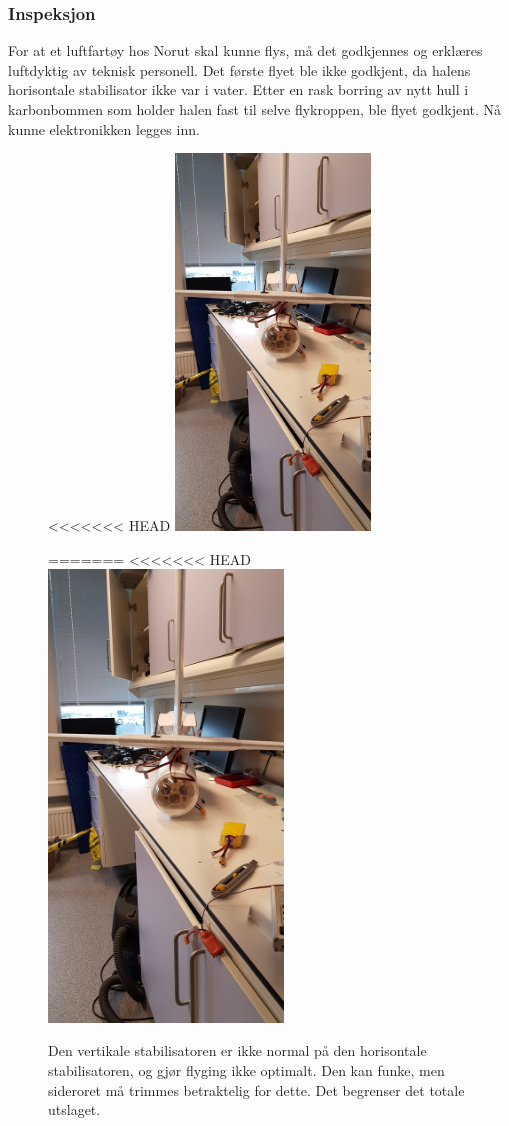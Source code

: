 \documentclass[12pt, a4paper]{article}
\begin{document}
\subsubsection{Inspeksjon}
For at et luftfartøy hos Norut skal kunne flys, må det godkjennes og erklæres luftdyktig av teknisk personell. Det første flyet ble ikke godkjent, da halens horisontale stabilisator ikke var i vater. Etter en rask borring av nytt hull i karbonbommen som holder halen fast til selve flykroppen, ble flyet godkjent. Nå kunne elektronikken legges inn. \\

\begin{figure}[ht]
	\centering
<<<<<<< HEAD
	\includegraphics[width = .5\textwidth, height = 10cm]{bilder/skjev_halefinne.jpg}
	\caption[Skjev stabilisator]{Den vertikale stabilisatoren er ikke normal på den horisontale stabilisatoren, og gjør flyging ikke optimalt. Den kan funke, men sideroret må trimmes betraktelig for dette. Det begrenser det totale utslaget.}
=======
<<<<<<< HEAD
	\includegraphics[width = .6\textwidth, height = 12cm]{bilder/skjev_halefinne.jpg}

\end{figure}
\end{document}

